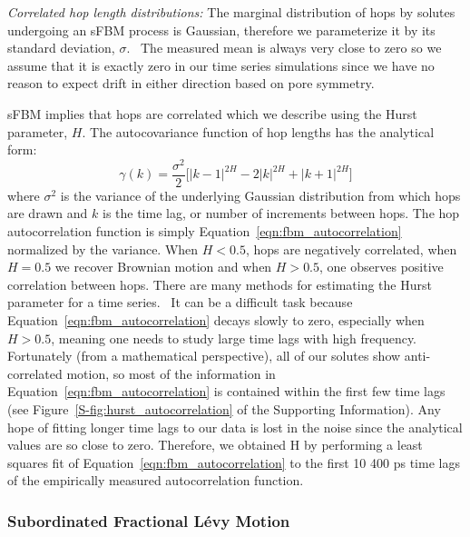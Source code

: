 \documentclass{article}
\begin{document}
  \textit{Correlated hop length distributions:} The marginal distribution of hops by solutes 
  undergoing an sFBM process is Gaussian, therefore we parameterize it by its standard deviation, 
  $\sigma$.~\cite{metzler_random_2000, metzler_anomalous_2014,neusius_subdiffusion_2009}
  The measured mean is always very close to zero so we assume that it is exactly zero
  in our time series simulations since we have no reason to expect drift in either direction
  based on pore symmetry.

  sFBM implies that hops are correlated which we describe using the Hurst parameter, $H$. 
  The autocovariance function of hop lengths has the analytical form:~\cite{mandelbrot_fractional_1968}
  \begin{equation}
    \gamma(k) = \dfrac{\sigma^2}{2}\bigg[|k-1|^{2H} - 2|k|^{2H} + |k+1|^{2H}\bigg]
  \label{eqn:fbm_autocorrelation}
  \end{equation}
  where $\sigma^2$ is the variance of the underlying Gaussian distribution from which hops are
  drawn and $k$ is the time lag, or number of increments between hops. The hop autocorrelation
  function is simply Equation~\ref{eqn:fbm_autocorrelation} normalized by the variance. 
  When $H < 0.5$, hops are negatively correlated, when $H = 0.5$ we recover Brownian motion
  and when $H > 0.5$, one observes positive correlation between hops. There are many methods
  for estimating the Hurst parameter for a time series.~\cite{clegg_practical_2006} It can
  be a difficult task because Equation~\ref{eqn:fbm_autocorrelation} decays slowly to zero, 
  especially when $H > 0.5$, meaning one needs to study large time lags with high frequency.
  Fortunately (from a mathematical perspective), all of our solutes show anti-correlated motion, so most of the information in
  Equation~\ref{eqn:fbm_autocorrelation} is contained within the first few time lags (see 
  Figure~\ref{S-fig:hurst_autocorrelation} of the Supporting Information). Any hope of
  fitting longer time lags to our data is lost in the noise since the analytical values
  are so close to zero. Therefore, we obtained H by performing a least squares fit of 
  Equation~\ref{eqn:fbm_autocorrelation} to the first 10 400 ps time lags of the 
  empirically measured autocorrelation function.

  \subsubsection{Subordinated Fractional L\'evy Motion}\label{method:sflm}
\end{document}
